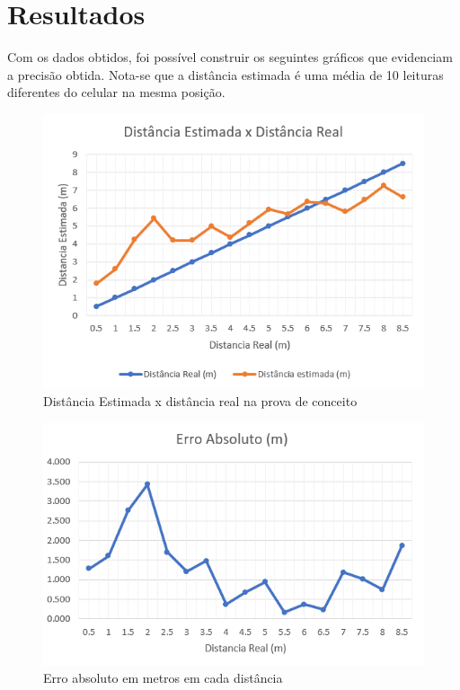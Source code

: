 \section{Resultados}

Com os dados obtidos, foi possível construir os seguintes gráficos que evidenciam a precisão obtida.
Nota-se que a distância estimada é uma média de 10 leituras diferentes do celular na mesma posição.

\begin{figure}[H]
	\centering
	\includegraphics[scale = 1]{images/grafico_distancias_1d.png}
	\caption{Distância Estimada x distância real na prova de conceito}
	\label{fig:grafico_distancia_1d}
\end{figure}

\begin{figure}[H]
	\centering
	\includegraphics[scale = 1]{images/grafico_erro_1d.png}
	\caption{Erro absoluto em metros em cada distância}
	\label{fig:grafico_erro_1d}
\end{figure}


